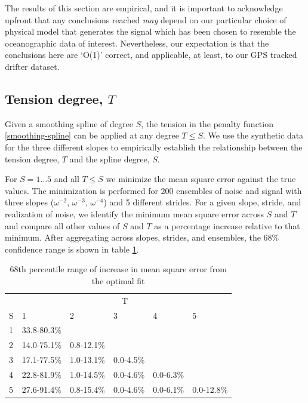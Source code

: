 \documentclass{ametsoc}
\begin{document}
The results of this section are empirical, and it is important to acknowledge upfront that any conclusions reached \emph{may} depend on our particular choice of physical model that generates the signal which has been chosen to resemble the oceanographic data of interest. Nevertheless, our expectation is that the conclusions here are `O(1)' correct, and applicable, at least, to our GPS tracked drifter dataset.

\subsection{Tension degree, $T$} \label{tension_degree}

Given a smoothing spline of degree $S$, the tension in the penalty function \eqref{smoothing-spline} can be applied at any degree $T\leq S$. We use the synthetic data for the three different slopes to empirically establish the relationship between the tension degree, $T$ and the spline degree, $S$. 

For $S=1\dots 5$ and all $T\leq S$ we minimize the mean square error against the true values. 
The minimization is performed for 200 ensembles of noise and signal with three slopes ($\omega^{-2}$, $\omega^{-3}$, $\omega^{-4}$) and 5 different strides. For a given slope, stride, and realization of noise, we identify the minimum mean square error across $S$ and $T$ and compare all other values of $S$ and $T$ as a percentage increase relative to that minimum. After aggregating across slopes, strides, and ensembles, the 68\% confidence range is shown in table \ref{optimal_T}.

\begin{table}[ht]
\caption{68th percentile range of increase in mean square error from the optimal fit}
\label{optimal_T}
\centering
\begin{tabular}{l *{5}{l}}
\toprule & \multicolumn{5}{c}{T} \\ 
\cmidrule(lr){2-6} 
S & 1 & 2 & 3 & 4 & 5 \\ \midrule 
1 & 33.8-80.3\% & & & & \\ 
2 & 14.0-75.1\% & 0.8-12.1\% & & & \\ 
3 & 17.1-77.5\% & 1.0-13.1\% & 0.0-4.5\% & & \\ 
4 & 22.8-81.9\% & 1.0-14.5\% & 0.0-4.6\% & 0.0-6.3\% & \\ 
5 & 27.6-91.4\% & 0.8-15.4\% & 0.0-4.6\% & 0.0-6.1\% & 0.0-12.8\% \\ 
 \bottomrule 
\end{tabular} 
\end{table}
\end{document}
